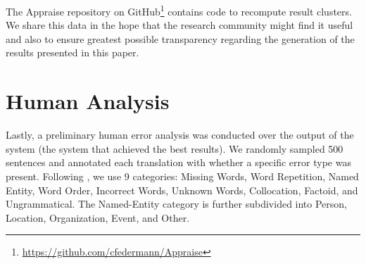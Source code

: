 \documentclass[a4paper]{article}
\begin{document}
\begin{CJK*}{UTF8}{gbsn}
The Appraise repository on GitHub\footnote{\url{https://github.com/cfedermann/Appraise}} contains code to recompute result clusters. We share this data in the hope that the research community might find it useful and also to ensure greatest possible transparency regarding the generation of the results presented in this paper.
 
\section{Human Analysis}
\label{human-analysis}
Lastly, a preliminary human error analysis was conducted over the output of the \ComboC{} system (the system that achieved the best results). We randomly sampled 500 sentences and annotated each translation with whether a specific error type was present. Following \cite{ErrorAnalysis}, we use 9 categories: Missing Words, Word Repetition, Named Entity, Word Order, Incorrect Words, Unknown Words, Collocation, Factoid, and Ungrammatical. The Named-Entity category is further subdivided into Person, Location, Organization, Event, and Other.



\end{CJK*}
\end{document}
